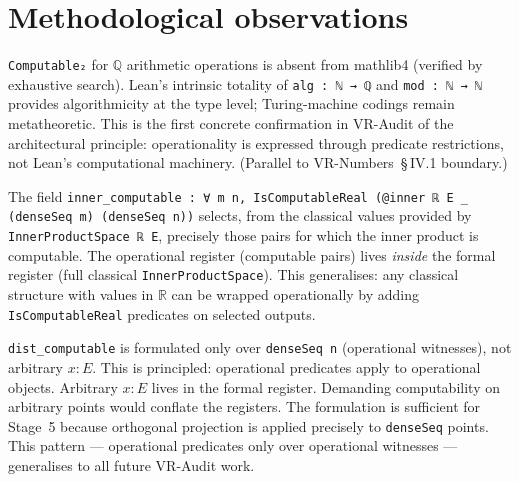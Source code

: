 \section{Methodological observations}
\label{sec:audit_method}

\begin{remark}
\label{rem:audit_obs1}
\leanok
{}
\texttt{Computable₂} for $\mathbb{Q}$ arithmetic operations is absent from
mathlib4 (verified by exhaustive search).  Lean's intrinsic totality of
\texttt{alg : ℕ → ℚ} and \texttt{mod : ℕ → ℕ} provides algorithmicity at
the type level; Turing-machine codings remain metatheoretic.  This is the
first concrete confirmation in VR-Audit of the architectural principle:
operationality is expressed through predicate restrictions, not
Lean's computational machinery.  (Parallel to VR-Numbers~§\,IV.1 boundary.)
\end{remark}

\begin{remark}
\label{rem:audit_obs2}
\leanok
{}
The field \texttt{inner\_computable : ∀ m n, IsComputableReal
(@inner ℝ E \_ (denseSeq m) (denseSeq n))} selects, from the
classical values provided by \texttt{InnerProductSpace ℝ E}, precisely
those pairs for which the inner product is computable.  The operational
register (computable pairs) lives \emph{inside} the formal register
(full classical \texttt{InnerProductSpace}).  This generalises: any
classical structure with values in $\mathbb{R}$ can be wrapped operationally
by adding \texttt{IsComputableReal} predicates on selected outputs.
\end{remark}

\begin{remark}
\label{rem:audit_obs3}
\leanok
{}
\texttt{dist\_computable} is formulated only over \texttt{denseSeq n}
(operational witnesses), not arbitrary $x : E$.  This is principled:
operational predicates apply to operational objects.  Arbitrary $x : E$
lives in the formal register.  Demanding computability on arbitrary
points would conflate the registers.  The formulation is sufficient
for Stage~5 because orthogonal projection is applied precisely to
\texttt{denseSeq} points.  This pattern --- operational predicates only
over operational witnesses --- generalises to all future VR-Audit work.
\end{remark}

